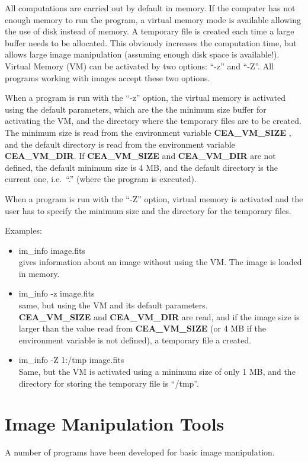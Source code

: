 All computations are carried out by default in memory. If the computer has
not
enough memory to run the program, a virtual memory mode is available
allowing the use of disk instead of memory. A temporary file is created
each time a large buffer needs to be allocated. This obviously  increases
the computation time, but allows large image manipulation (assuming enough
disk
space is available!). Virtual Memory (VM) can be activated by two options: 
``-z''
and ``-Z''. All programs working with images accept these two options. 

When a program is run with the 
``-z'' option, the virtual memory is activated using
the default parameters, which are the the minimum size buffer 
for activating the VM, and the directory where the temporary files are to
be created.
The minimum size is read from the environment variable {\bf
CEA\_VM\_SIZE} , and
the default directory is read from the environment variable {\bf
CEA\_VM\_DIR}.
If {\bf CEA\_VM\_SIZE} and {\bf CEA\_VM\_DIR} 
are not defined, the default 
 minimum size is 4 MB, and the default directory is  the current one, 
i.e.\ ``.'' (where the program is executed). 

When a program is run with the ``-Z'' option, virtual memory is activated
and the user has to specify the 
minimum size and the directory for the temporary files.

Examples:
\begin{itemize}
\item im\_info image.fits \\
gives information about an image without using the VM. The image is
loaded in memory.
\item im\_info -z image.fits \\
same, but using the VM and its default parameters.  \\
 {\bf CEA\_VM\_SIZE} and
{\bf CEA\_VM\_DIR} are read, and if the image size is larger than the
value
read from {\bf CEA\_VM\_SIZE} (or 4 MB if the environment variable
is not defined), a temporary file a created.
\item im\_info  -Z 1:/tmp image.fits \\
Same, but the VM is activated using a minimum size of only 1 MB, and
the directory for storing the temporary file is ``/tmp''. 
\end{itemize}


\newpage

\section{Image Manipulation Tools}
A number of programs have been developed for basic image manipulation.

